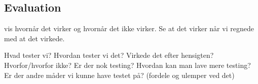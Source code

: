 
\subsection{Evaluation}

vis hvornår det virker og hvornår det ikke virker. 
Se at det virker når vi regnede med at det virkede.

Hvad tester vi?
Hvordan tester vi det?
Virkede det efter hensigten?
Hvorfor/hvorfor ikke?
Er der nok testing?
Hvordan kan man lave mere testing?
Er der andre måder vi kunne have testet på? (fordele og ulemper ved det)
